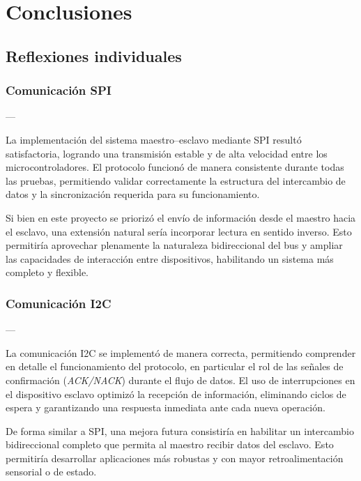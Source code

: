 \section{Conclusiones}

\subsection{Reflexiones individuales}

\subsubsection{\textbf{Comunicación SPI}} --- 

La implementación del sistema maestro–esclavo mediante SPI resultó satisfactoria, logrando una transmisión estable y de alta velocidad entre los microcontroladores. El protocolo funcionó de manera consistente durante todas las pruebas, permitiendo validar correctamente la estructura del intercambio de datos y la sincronización requerida para su funcionamiento.

\vspace{1em}

Si bien en este proyecto se priorizó el envío de información desde el maestro hacia el esclavo, una extensión natural sería incorporar lectura en sentido inverso. Esto permitiría aprovechar plenamente la naturaleza bidireccional del bus y ampliar las capacidades de interacción entre dispositivos, habilitando un sistema más completo y flexible.

\vspace{1em}
\subsubsection{\textbf{Comunicación I2C}} --- 

La comunicación I2C se implementó de manera correcta, permitiendo comprender en detalle el funcionamiento del protocolo, en particular el rol de las señales de confirmación (\textit{ACK/NACK}) durante el flujo de datos. El uso de interrupciones en el dispositivo esclavo optimizó la recepción de información, eliminando ciclos de espera y garantizando una respuesta inmediata ante cada nueva operación.

\vspace{1em}

De forma similar a SPI, una mejora futura consistiría en habilitar un intercambio bidireccional completo que permita al maestro recibir datos del esclavo. Esto permitiría desarrollar aplicaciones más robustas y con mayor retroalimentación sensorial o de estado.

